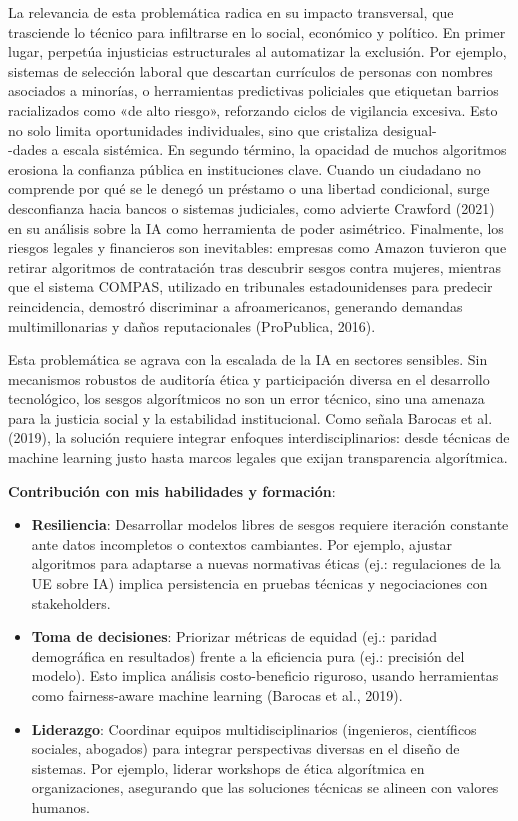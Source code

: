 \documentclass[12pt]{article}
\begin{document}
La relevancia de esta problemática radica en su impacto transversal, que trasciende lo técnico para infiltrarse en lo social, económico y político. En primer lugar, perpetúa injusticias estructurales al automatizar la exclusión. Por ejemplo, sistemas de selección laboral que descartan currículos de personas con nombres asociados a minorías, o herramientas predictivas policiales que etiquetan barrios racializados como «de alto riesgo», reforzando ciclos de vigilancia excesiva. Esto no solo limita oportunidades individuales, sino que cristaliza desigual-\\-dades a escala sistémica. En segundo término, la opacidad de muchos algoritmos erosiona la confianza pública en instituciones clave. Cuando un ciudadano no comprende por qué se le denegó un préstamo o una libertad condicional, surge desconfianza hacia bancos o sistemas judiciales, como advierte Crawford (2021) en su análisis sobre la IA como herramienta de poder asimétrico. Finalmente, los riesgos legales y financieros son inevitables: empresas como Amazon tuvieron que retirar algoritmos de contratación tras descubrir sesgos contra mujeres, mientras que el sistema COMPAS, utilizado en tribunales estadounidenses para predecir reincidencia, demostró discriminar a afroamericanos, generando demandas multimillonarias y daños reputacionales (ProPublica, 2016).

Esta problemática se agrava con la escalada de la IA en sectores sensibles. Sin mecanismos robustos de auditoría ética y participación diversa en el desarrollo tecnológico, los sesgos algorítmicos no son un error técnico, sino una amenaza para la justicia social y la estabilidad institucional. Como señala Barocas et al. (2019), la solución requiere integrar enfoques interdisciplinarios: desde técnicas de machine learning justo hasta marcos legales que exijan transparencia algorítmica.

\textbf{Contribución con mis habilidades y formación}:
\begin{itemize}
    \item \textbf{Resiliencia}: Desarrollar modelos libres de sesgos requiere iteración constante ante datos incompletos o contextos cambiantes. Por ejemplo, ajustar algoritmos para adaptarse a nuevas normativas éticas (ej.: regulaciones de la UE sobre IA) implica persistencia en pruebas técnicas y negociaciones con stakeholders.
    \item \textbf{Toma de decisiones}: Priorizar métricas de equidad (ej.: paridad demográfica en resultados) frente a la eficiencia pura (ej.: precisión del modelo). Esto implica análisis costo-beneficio riguroso, usando herramientas como fairness-aware machine learning (Barocas et al., 2019).
    \item \textbf{Liderazgo}: Coordinar equipos multidisciplinarios (ingenieros, científicos sociales, abogados) para integrar perspectivas diversas en el diseño de sistemas. Por ejemplo, liderar workshops de ética algorítmica en organizaciones, asegurando que las soluciones técnicas se alineen con valores humanos. 
\end{itemize}
\end{document}
